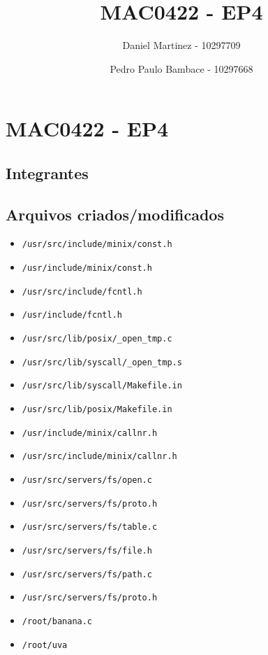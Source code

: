 \documentclass[]{article}
\date{}
\providecommand{\tightlist}{%
  \setlength{\itemsep}{0pt}\setlength{\parskip}{0pt}}
\begin{document}
\hypertarget{mac0422---ep3}{%
\section{MAC0422 - EP4}\label{mac0422---ep3}}

\hypertarget{integrantes}{%
\subsection{Integrantes}\label{integrantes}}

\title{\textbf{MAC0422 - EP4}}
\author{Daniel Martinez - 10297709 
  \and Pedro Paulo Bambace - 10297668}

\maketitle

\hypertarget{arquivos-criadosmodificados}{%
\subsection{Arquivos
criados/modificados}\label{arquivos-criadosmodificados}}

\begin{itemize}
\tightlist
\item
  \texttt{/usr/src/include/minix/const.h}
\item
  \texttt{/usr/include/minix/const.h}
\item
  \texttt{/usr/src/include/fcntl.h}
\item
  \texttt{/usr/include/fcntl.h}
\item
  \texttt{/usr/src/lib/posix/\_open\_tmp.c}
\item
  \texttt{/usr/src/lib/syscall/\_open\_tmp.s}
\item
  \texttt{/usr/src/lib/syscall/Makefile.in}
\item
  \texttt{/usr/src/lib/posix/Makefile.in}
\item
  \texttt{/usr/include/minix/callnr.h}
\item
  \texttt{/usr/src/include/minix/callnr.h}
\item
  \texttt{/usr/src/servers/fs/open.c}
\item
  \texttt{/usr/src/servers/fs/proto.h}
\item
  \texttt{/usr/src/servers/fs/table.c}
\item
  \texttt{/usr/src/servers/fs/file.h}
\item
  \texttt{/usr/src/servers/fs/path.c}
\item
  \texttt{/usr/src/servers/fs/proto.h}
\item
  \texttt{/root/banana.c}
\item
  \texttt{/root/uva}
\end{itemize}
\end{document}
